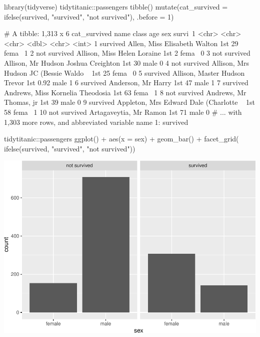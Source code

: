 \begin{Schunk}
\begin{Sinput}
library(tidyverse)
tidytitanic::passengers %
  tibble() %
  mutate(cat_survived = ifelse(survived, "survived", "not survived"), 
         .before = 1)
\end{Sinput}
\begin{Soutput}
     # A tibble: 1,313 x 6
        cat_survived name                                   class   age sex   survi~1
        <chr>        <chr>                                  <chr> <dbl> <chr>   <int>
      1 survived     Allen, Miss Elisabeth Walton           1st   29    fema~       1
      2 not survived Allison, Miss Helen Loraine            1st    2    fema~       0
      3 not survived Allison, Mr Hudson Joshua Creighton    1st   30    male        0
      4 not survived Allison, Mrs Hudson JC (Bessie Waldo ~ 1st   25    fema~       0
      5 survived     Allison, Master Hudson Trevor          1st    0.92 male        1
      6 survived     Anderson, Mr Harry                     1st   47    male        1
      7 survived     Andrews, Miss Kornelia Theodosia       1st   63    fema~       1
      8 not survived Andrews, Mr Thomas, jr                 1st   39    male        0
      9 survived     Appleton, Mrs Edward Dale (Charlotte ~ 1st   58    fema~       1
     10 not survived Artagaveytia, Mr Ramon                 1st   71    male        0
     # ... with 1,303 more rows, and abbreviated variable name 1: survived
\end{Soutput}
\begin{Sinput}
tidytitanic::passengers %
ggplot() + 
  aes(x = sex) + 
  geom_bar() + 
  facet_grid(~ ifelse(survived, "survived", "not survived")) 
\end{Sinput}

\includegraphics[width=0.69\linewidth]{r_journal_files/figure-latex/unnamed-chunk-3-1} \end{Schunk}

